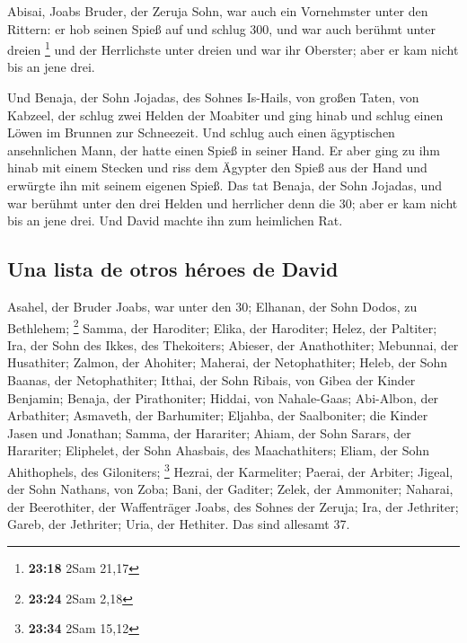  Abisai, Joabs Bruder, der Zeruja Sohn, war auch ein
Vornehmster unter den Rittern: er hob seinen Spieß auf und schlug 300,
und war auch berühmt unter dreien \footnote{\textbf{23:18} 2Sam 21,17}
 und der Herrlichste unter dreien und war ihr Oberster;
aber er kam nicht bis an jene drei.

 Und Benaja, der Sohn Jojadas, des Sohnes Is-Hails, von
großen Taten, von Kabzeel, der schlug zwei Helden der Moabiter und ging
hinab und schlug einen Löwen im Brunnen zur Schneezeit. 
Und schlug auch einen ägyptischen ansehnlichen Mann, der hatte einen
Spieß in seiner Hand. Er aber ging zu ihm hinab mit einem Stecken und
riss dem Ägypter den Spieß aus der Hand und erwürgte ihn mit seinem
eigenen Spieß.  Das tat Benaja, der Sohn Jojadas, und war
berühmt unter den drei Helden  und herrlicher denn die
30; aber er kam nicht bis an jene drei. Und David machte ihn zum
heimlichen Rat.

\hypertarget{una-lista-de-otros-huxe9roes-de-david}{%
\subsection{Una lista de otros héroes de
David}\label{una-lista-de-otros-huxe9roes-de-david}}

 Asahel, der Bruder Joabs, war unter den 30; Elhanan, der
Sohn Dodos, zu Bethlehem; \footnote{\textbf{23:24} 2Sam 2,18}
 Samma, der Haroditer; Elika, der Haroditer;
 Helez, der Paltiter; Ira, der Sohn des Ikkes, des
Thekoiters;  Abieser, der Anathothiter; Mebunnai, der
Husathiter;  Zalmon, der Ahohiter; Maherai, der
Netophathiter;  Heleb, der Sohn Baanas, der
Netophathiter; Itthai, der Sohn Ribais, von Gibea der Kinder Benjamin;
 Benaja, der Pirathoniter; Hiddai, von Nahale-Gaas;
 Abi-Albon, der Arbathiter; Asmaveth, der Barhumiter;
 Eljahba, der Saalboniter; die Kinder Jasen und Jonathan;
 Samma, der Harariter; Ahiam, der Sohn Sarars, der
Harariter;  Eliphelet, der Sohn Ahasbais, des
Maachathiters; Eliam, der Sohn Ahithophels, des Giloniters; \footnote{\textbf{23:34}
  2Sam 15,12}  Hezrai, der Karmeliter; Paerai, der
Arbiter;  Jigeal, der Sohn Nathans, von Zoba; Bani, der
Gaditer;  Zelek, der Ammoniter; Naharai, der Beerothiter,
der Waffenträger Joabs, des Sohnes der Zeruja;  Ira, der
Jethriter; Gareb, der Jethriter;  Uria, der Hethiter. Das
sind allesamt 37.

